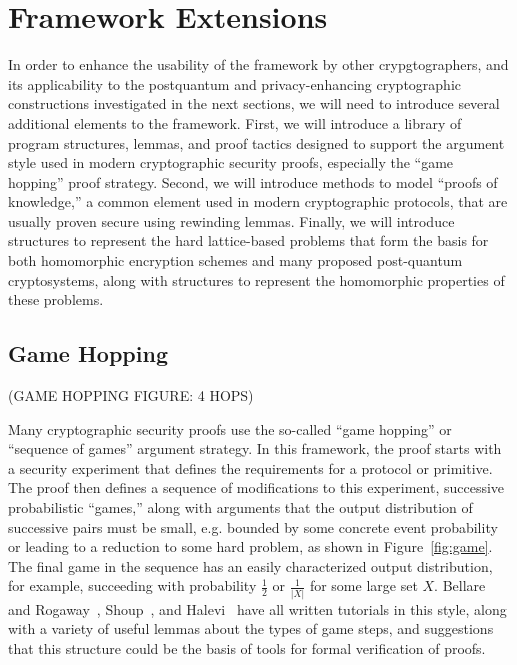 \section{Framework Extensions}

In order to enhance the usability of the \vcvio framework by other crypgtographers, and its applicability to the postquantum and privacy-enhancing cryptographic constructions investigated in the next sections, we will need to introduce several additional elements to the framework. 
First, we will introduce a library of program structures, lemmas, and proof tactics designed to support the argument style used in modern cryptographic security proofs, especially the ``game hopping'' proof strategy.  
Second, we will introduce methods to model ``proofs of knowledge,'' a common element used in modern cryptographic protocols, that are usually proven secure using rewinding lemmas.
Finally, we will introduce \vcvio structures to represent the hard lattice-based problems that form the basis for both homomorphic encryption schemes and many proposed post-quantum cryptosystems, along with structures to represent the homomorphic properties of these problems.

\subsection{Game Hopping} \label{sec:games}

(GAME HOPPING FIGURE: 4 HOPS)

Many cryptographic security proofs use the so-called ``game hopping'' or ``sequence of games'' argument strategy.
In this framework, the proof starts with a security experiment that defines the requirements for a protocol or primitive.
The proof then defines a sequence of modifications to this experiment, successive probabilistic ``games,'' along with arguments that the output distribution of successive pairs must be small, e.g. bounded by some concrete event probability or leading to a reduction to some hard problem, as shown in Figure~\ref{fig:game}.
The final game in the sequence has an easily characterized output distribution, for example, succeeding with probability $\frac{1}{2}$ or $\frac{1}{|X|}$ for some large set $X$.
Bellare and Rogaway~\cite{bellare2006security}, Shoup~\cite{shoup2004sequences}, and Halevi~\cite{halevi2005plausible} have all written tutorials in this style, along with a variety of useful lemmas about the types of game steps, and suggestions that this structure could be the basis of tools for formal verification of proofs.

